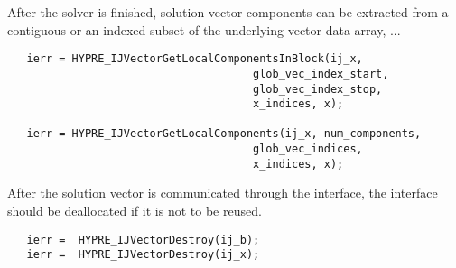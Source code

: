 \noindent After the solver is finished, solution vector components
can be extracted from a contiguous or an indexed subset of
the underlying vector data array, ...

\begin{verbatim}
   ierr = HYPRE_IJVectorGetLocalComponentsInBlock(ij_x,
                                      glob_vec_index_start,
                                      glob_vec_index_stop,
                                      x_indices, x);

   ierr = HYPRE_IJVectorGetLocalComponents(ij_x, num_components,
                                      glob_vec_indices,
                                      x_indices, x);
\end{verbatim}

\noindent After the solution vector is communicated through the interface,
the interface should be deallocated if it is not to be reused.

\begin{verbatim}
   ierr =  HYPRE_IJVectorDestroy(ij_b);
   ierr =  HYPRE_IJVectorDestroy(ij_x);
\end{verbatim}



